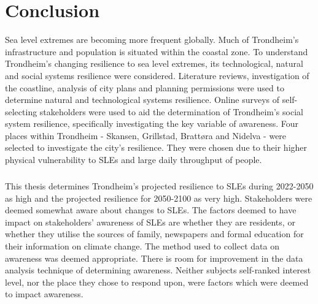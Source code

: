 

\chapter{Conclusion}

Sea level extremes are becoming more frequent globally. Much of Trondheim's infrastructure and population is situated within the coastal zone. To understand Trondheim's changing resilience to sea level extremes, its technological, natural and social systems resilience were considered. Literature reviews, investigation of the coastline, analysis of city plans and planning permissions were used to determine natural and technological systems resilience. Online surveys of self-selecting stakeholders were used to aid the determination of Trondheim's social system resilience, specifically investigating the key variable of awareness. Four places within Trondheim - Skansen, Grillstad, Brattøra and Nidelva - were selected to investigate the city's resilience. They were chosen due to their higher physical vulnerability to SLEs and large daily throughput of people.
\paragraph{}
This thesis determines Trondheim's projected resilience to SLEs during 2022-2050 as high and the projected resilience for 2050-2100 as very high. Stakeholders were deemed somewhat aware about changes to SLEs. The factors deemed to have impact on stakeholders' awareness of SLEs are whether they are residents, or whether they utilise the sources of family, newspapers and formal education for their information on climate change. The method used to collect data on awareness was deemed appropriate. There is room for improvement in the data analysis technique of determining awareness. Neither subjects self-ranked interest level, nor the place they chose to respond upon, were factors which were deemed to impact awareness.
